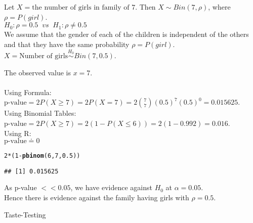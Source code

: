 \documentclass[bigtut]{tutorial}\usepackage[]{graphicx}\usepackage[]{color}
\makeatletter
\newcommand{\hlnum}[1]{\textcolor[rgb]{0.686,0.059,0.569}{#1}}%
\newcommand{\hlopt}[1]{\textcolor[rgb]{0,0,0}{#1}}%
\newcommand{\hlstd}[1]{\textcolor[rgb]{0.345,0.345,0.345}{#1}}%
\newcommand{\hlkwd}[1]{\textcolor[rgb]{0.737,0.353,0.396}{\textbf{#1}}}%
\newenvironment{kframe}{%
 \def\at@end@of@kframe{}%
 \ifinner\ifhmode%
  \def\at@end@of@kframe{\end{minipage}}%
  \begin{minipage}{\columnwidth}%
 \fi\fi%
 \def\FrameCommand##1{\hskip\@totalleftmargin \hskip-\fboxsep
 \colorbox{shadecolor}{##1}\hskip-\fboxsep
     \hskip-\linewidth \hskip-\@totalleftmargin \hskip\columnwidth}%
 \MakeFramed {\advance\hsize-\width
   \@totalleftmargin\z@ \linewidth\hsize
   \@setminipage}}%
 {\par\unskip\endMakeFramed%
 \at@end@of@kframe}
\newenvironment{knitrout}{}{} %
\makeatother
\begin{document}
\begin{tutorial}
\begin{questions}
\begin{solution}
Let $X = \text{the number of girls in family of 7}$. Then $X \sim Bin(7, \rho)$, where $\rho = P(girl)$. \\

 $H_0: \rho=0.5  \;\; vs \;\; H_1: \rho \neq 0.5$ \\
 
 We assume that the gender of each of the children is independent of the others and that they have the  same probability $\rho = P(girl)$.\\

 $X = \text{Number of girls} \overset{H_0}{\sim} Bin(7, 0.5)$. 

The observed value is $x=7$. \\
 
 \\

Using Formula:\\
$\text{p-value} = 2 P(X \geq 7) = 2 P(X=7) = 2 {7 \choose 7} (0.5)^7(0.5)^0  = 0.015625$. \\

Using Binomial Tables:\\
$\text{p-value} = 2 P(X \geq 7) = 2 (1-P(X\leq 6)) =2 (1-0.992) = 0.016$. \\

Using R: \\
$\text{p-value} \doteq 0 $
\begin{knitrout}
\color{fgcolor}\begin{kframe}
\begin{alltt}
\hlnum{2}\hlopt{*}\hlstd{(}\hlnum{1}\hlopt{-}\hlkwd{pbinom}\hlstd{(}\hlnum{6}\hlstd{,}\hlnum{7}\hlstd{,}\hlnum{0.5}\hlstd{))}
\end{alltt}
\begin{verbatim}
## [1] 0.015625
\end{verbatim}
\end{kframe}
\end{knitrout}

\vspace{.5cm}
 As p-value $ < < 0.05$, we have evidence against $H_{0}$ at $\alpha =0.05$. \\
Hence there is evidence against the family having girls with $\rho = 0.5$. \\

\end{solution}


\question  Taste-Testing \\


\end{questions}
\end{tutorial}
\end{document}
